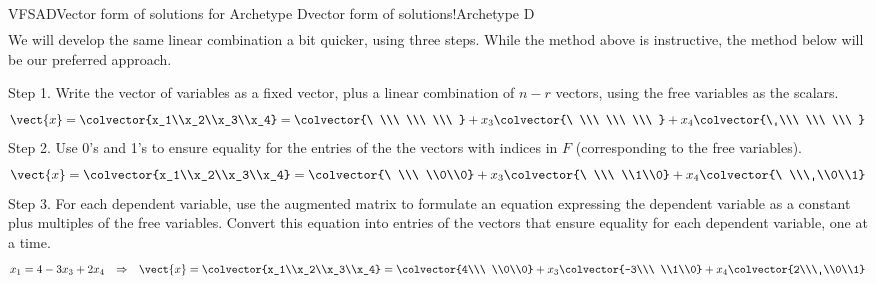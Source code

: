 \begin{example}{VFSAD}{Vector form of solutions for Archetype D}{vector form of solutions!Archetype D}
\begin{align*}
%
\end{align*}
%
We will develop the same linear combination a bit quicker, using three steps.  While the method above is instructive, the method below will be our preferred approach.\par
%
Step 1.  Write the vector of variables as a fixed vector, plus a linear combination of $n-r$ vectors, using the free variables as the scalars.
%
\begin{equation*}
\vect{x}=\colvector{x_1\\x_2\\x_3\\x_4}=
\colvector{\ \\\ \\\ \\\ }+x_3\colvector{\ \\\ \\\ \\\ }+x_4\colvector{\ \\\ \\\ \\\ }
\end{equation*}
%
Step 2.  Use 0's and 1's to ensure equality for the  entries of the the vectors with indices in $F$ (corresponding to the free variables).
%
\begin{equation*}
\vect{x}=\colvector{x_1\\x_2\\x_3\\x_4}=
\colvector{\ \\\ \\0\\0}+x_3\colvector{\ \\\ \\1\\0}+x_4\colvector{\ \\\ \\0\\1}
\end{equation*}
%
Step 3.  For each dependent variable, use the augmented matrix to formulate an equation expressing the dependent variable as a constant plus multiples of the free variables.  Convert this equation into entries of the vectors that ensure equality for each dependent variable, one at a time.
%
\begin{align*}
x_1=4-3x_3+2x_4&&\Rightarrow&&
\vect{x}=\colvector{x_1\\x_2\\x_3\\x_4}=
\colvector{4\\\ \\0\\0}+x_3\colvector{-3\\\ \\1\\0}+x_4\colvector{2\\\ \\0\\1}\\

\end{align*}
\end{example}
